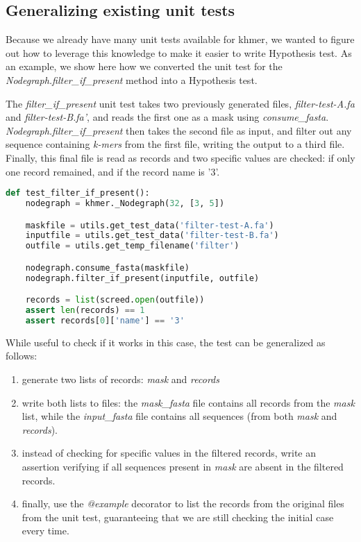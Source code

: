 \documentclass[preprint,nocopyrightspace]{sig-alternate}
\begin{document}
\subsection{Generalizing existing unit tests}

Because we already have many unit tests available for khmer,
we wanted to figure out how to leverage this knowledge to make it easier to write Hypothesis test.
As an example,
we show here how we converted the unit test for the \emph{Nodegraph.filter\_if\_present} method into a Hypothesis test.

The \emph{filter\_if\_present} unit test takes two previously generated files,
\emph{filter-test-A.fa} and \emph{filter-test-B.fa'},
and reads the first one as a mask using \emph{consume\_fasta}.
\emph{Nodegraph.filter\_if\_present} then takes the second file as input,
and filter out any sequence containing \emph{k-mers} from the first file,
writing the output to a third file.
Finally,
this final file is read as records and two specific values are checked:
if only one record remained,
and if the record name is '3'.

\begin{lstlisting}[language=Python,basicstyle=\tiny\tt,caption={filter\_if\_present unit test},label={FilterUnit}]
def test_filter_if_present():
    nodegraph = khmer._Nodegraph(32, [3, 5])

    maskfile = utils.get_test_data('filter-test-A.fa')
    inputfile = utils.get_test_data('filter-test-B.fa')
    outfile = utils.get_temp_filename('filter')

    nodegraph.consume_fasta(maskfile)
    nodegraph.filter_if_present(inputfile, outfile)

    records = list(screed.open(outfile))
    assert len(records) == 1
    assert records[0]['name'] == '3'

\end{lstlisting}

While useful to check if it works in this case,
the test can be generalized as follows:

\begin{enumerate}
\item generate two lists of records: \emph{mask} and \emph{records}
\item write both lists to files: the \emph{mask\_fasta} file contains all records from the \emph{mask} list,
while the \emph{input\_fasta} file contains all sequences (from both \emph{mask} and \emph{records}).
\item instead of checking for specific values in the filtered records,
write an assertion verifying if all sequences present in \emph{mask} are absent in the filtered records.
\item finally, use the \emph{@example} decorator to list the records from the original files from the unit test,
guaranteeing that we are still checking the initial case every time.
\end{enumerate}
\end{document}
